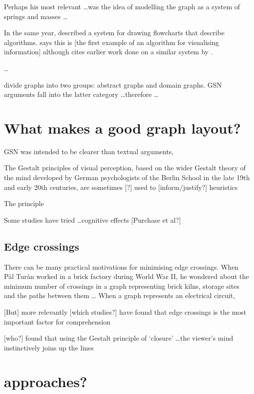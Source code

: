 \documentclass[authoryearcitations]{UoYCSproject}
\begin{document}
\begin{itemize*}
Perhaps his most relevant \ldots was the idea of modelling the graph as a system of springs and masses \ldots 

In the same year, \citet{Knuth63} described a system for drawing flowcharts that describe algorithms. \citet{battista}  says this is [the first example of an algorithm for visualising information] although \citeauthor{Knuth63} cites earlier work done on a similar system by \citet{haibt1959}.




\ldots

\citet{huang2007effects} divide graphs into two groups: abstract graphs and domain graphs.
GSN arguments fall into the latter category \ldots  therefore \ldots
{}


\section{What makes a good graph layout?}


GSN was intended to be clearer than textual arguments, 

The Gestalt principles of visual perception, based on the wider Gestalt theory of the mind developed by German psychologists of the Berlin School in the late 19th and early 20th centuries, are sometimes [?] used to [inform/justify?] heuristics

The principle 

Some studies have tried \ldots cognitive effects [Purchase et al?]

\subsection{Edge crossings}

There can be many practical motivations for minimising edge crossings.
When P\`{a}l Tur\`{a}n worked in a brick factory during World War II,
he wondered about the minimum number of crossings in a graph representing
brick kilns, storage sites and the paths between them \ldots
When a graph represents an electrical circuit, 

[But] more relevantly [which studies?] have found that edge crossings is the most important factor for comprehension

[who?] found that using the Gestalt principle of `closure' \ldots the viewer's mind instinctively joins up the lines

\section{approaches?}


\end{itemize*}
\end{document}
